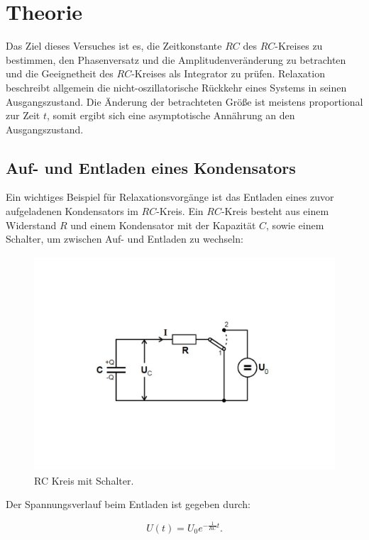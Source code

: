\section{Theorie}
\label{sec:Theorie}

Das Ziel dieses Versuches ist es, die Zeitkonstante $RC$ des $RC$-Kreises zu bestimmen, den Phasenversatz und die Amplitudenveränderung
zu betrachten und die Geeignetheit des $RC$-Kreises als Integrator zu prüfen.  
Relaxation beschreibt allgemein die nicht-oszillatorische Rückkehr eines Systems in seinen Ausgangszustand.
Die Änderung der betrachteten Größe ist meistens proportional zur Zeit $t$, somit ergibt sich eine asymptotische
Annährung an den Ausgangszustand.\cite{v353}

\subsection{Auf- und Entladen eines Kondensators}
Ein wichtiges Beispiel für Relaxationsvorgänge ist das Entladen eines zuvor aufgeladenen Kondensators im $RC$-Kreis.
Ein $RC$-Kreis besteht aus einem Widerstand $R$ und einem Kondensator mit der Kapazität $C$, sowie einem Schalter, um zwischen 
Auf- und Entladen zu wechseln:
\begin{figure}
    \centering
    \includegraphics[height=8cm]{content/Theorie - RC-Kreis.pdf}
    \caption{RC Kreis mit Schalter. \cite{v353}}
    \label{fig:Theorie - RC_Kreis}
\end{figure}

Der Spannungsverlauf beim Entladen ist gegeben durch:

\begin{equation}
    U(t)= U_{0}e^{-\frac{1}{RC}t}.  \label{eqn:Entladen}
\end{equation}

